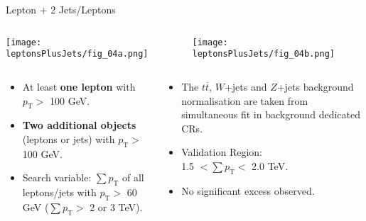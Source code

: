 \documentclass[8pt]{beamer}
\begin{document}
\begin{frame}{\large Lepton + 2 Jets/Leptons }

  \begin{columns}
   \begin{column}{6cm}
    \texttt{[image: leptonsPlusJets/fig\_04a.png]}\\
   \end{column}
   \begin{column}{6cm}
    \texttt{[image: leptonsPlusJets/fig\_04b.png]}\\
   \end{column}
  \end{columns}
  \begin{columns}
   \begin{column}{6cm}
   \begin{itemize}
  \item At least \textbf{one lepton} with $p_\mathrm{T} >$ 100 GeV.
  \item \textbf{Two additional objects} (leptons or jets) with $p_\mathrm{T} >$ 100 GeV.
  \item Search variable: $\sum p_\mathrm{T}$ of all leptons/jets with $p_\mathrm{T} >$ 60 GeV ($\sum p_\mathrm{T} >$ 2 or 3 TeV).
 \end{itemize}
   \end{column}
   \begin{column}{6cm}
    \begin{itemize}
     \item The $t\overline{t}$, $W$+jets and $Z$+jets background normalisation are taken from 
	   simultaneous fit in background dedicated CRs.
     \item Validation Region: \\
           1.5 $< \sum p_\mathrm{T} <$ 2.0 TeV.
     \item No significant excess observed.
    \end{itemize}
   
   \end{column}
  \end{columns}

\end{frame}
\end{document}
